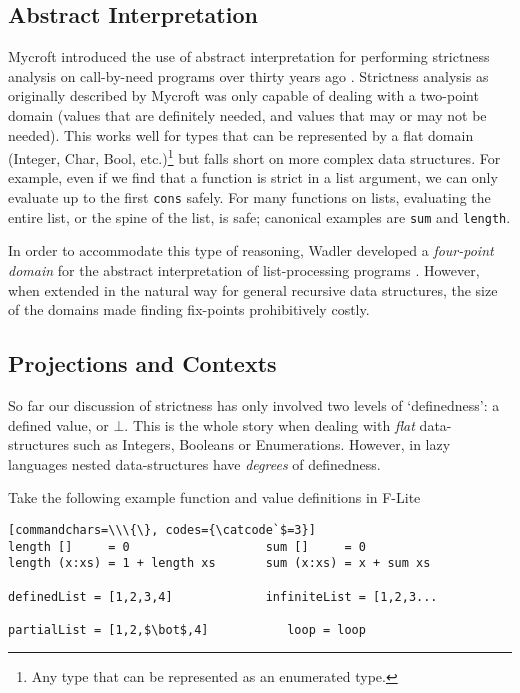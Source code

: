 \subsection{Abstract Interpretation}

Mycroft introduced the use of abstract interpretation for performing strictness
analysis on call-by-need programs over thirty years ago
\citep{mycroft1980theory}.
Strictness analysis as originally described by Mycroft was only capable of
dealing with a two-point domain (values that are definitely needed, and values
that may or may not be needed). This works well for types that can be
represented by a flat domain (Integer, Char, Bool, etc.)\footnote{Any type that
can be represented as an enumerated type.} but falls short on more complex data
structures. For example, even if we find that a function is strict in a list
argument, we can only evaluate up to the first \verb'cons' safely. For many
functions on lists, evaluating the entire list, or the spine of the list, is
safe; canonical examples are \verb'sum' and \verb'length'.

In order to accommodate this type of reasoning, Wadler developed a
\emph{four-point domain} for the abstract interpretation of list-processing
programs \citep{wadler1987strictness}. However, when extended in the natural way
for general recursive data structures, the size of the domains made finding
fix-points prohibitively costly.

\subsection{Projections and Contexts}
\label{sec:projections}

So far our discussion of strictness has only involved two levels of
`definedness': a defined value, or $\bot$. This is the whole story when dealing
with \emph{flat} data-structures such as Integers, Booleans or Enumerations.
However, in lazy languages nested data-structures have \emph{degrees} of
definedness.

Take the following example function and value definitions in F-Lite
\smallskip

\begin{centering}
\begin{verbatim}[commandchars=\\\{\}, codes={\catcode`$=3}]
length []     = 0                   sum []     = 0
length (x:xs) = 1 + length xs       sum (x:xs) = x + sum xs

definedList = [1,2,3,4]             infiniteList = [1,2,3...

partialList = [1,2,$\bot$,4]           loop = loop
\end{verbatim}
\end{centering}

